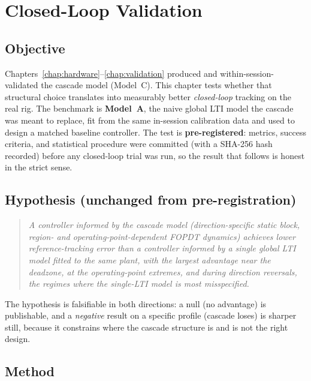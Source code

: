 \chapter{Closed-Loop Validation}
\label{chap:closedloop}

\section{Objective}
\label{sec:cl-obj}

Chapters~\ref{chap:hardware}--\ref{chap:validation} produced and within-session-validated the cascade model (Model~C). This chapter tests whether that structural choice translates into measurably better \emph{closed-loop} tracking on the real rig. The benchmark is \textbf{Model~A}, the naive global LTI model the cascade was meant to replace, fit from the same in-session calibration data and used to design a matched baseline controller. The test is \textbf{pre-registered}: metrics, success criteria, and statistical procedure were committed (with a SHA-256 hash recorded) before any closed-loop trial was run, so the result that follows is honest in the strict sense.

\section{Hypothesis (unchanged from pre-registration)}
\label{sec:cl-hyp}

\begin{quote}
\itshape
A controller informed by the cascade model (direction-specific static block, region- and operating-point-dependent FOPDT dynamics) achieves lower reference-tracking error than a controller informed by a single global LTI model fitted to the same plant, with the largest advantage near the deadzone, at the operating-point extremes, and during direction reversals, the regimes where the single-LTI model is most misspecified.
\end{quote}

The hypothesis is falsifiable in both directions: a null (no advantage) is publishable, and a \emph{negative} result on a specific profile (cascade loses) is sharper still, because it constrains where the cascade structure is and is not the right design.

\section{Method}
\label{sec:cl-method}

